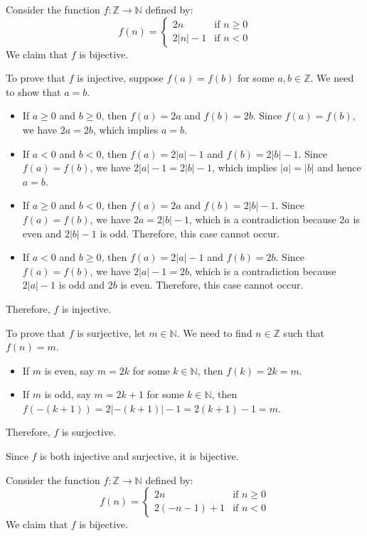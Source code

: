 \documentclass[11pt]{article}
\begin{document}
\begin{example}
    Consider the function $f: \mathbb{Z} \to \mathbb{N}$ defined by:
    \[
        f(n) = 
        \begin{cases} 
            2n & \text{if } n \geq 0 \\
            2|n| - 1 & \text{if } n < 0 
        \end{cases}
    \]
    We claim that $f$ is bijective.

    To prove that $f$ is injective, suppose $f(a) = f(b)$ for some $a, b \in \mathbb{Z}$. We need to show that $a = b$.
    \begin{itemize}
        \item If $a \geq 0$ and $b \geq 0$, then $f(a) = 2a$ and $f(b) = 2b$. Since $f(a) = f(b)$, we have $2a = 2b$, which implies $a = b$.
        \item If $a < 0$ and $b < 0$, then $f(a) = 2 |a| - 1$ and $f(b) = 2 |b| - 1$. Since $f(a) = f(b)$, we have $2 |a| - 1 = 2 |b| - 1$, which implies $ |a| =  |b|$ and hence $a = b$.
        \item If $a \geq 0$ and $b < 0$, then $f(a) = 2a$ and $f(b) = 2 |b| - 1$. Since $f(a) = f(b)$, we have $2a = 2  |b| - 1$, which is a contradiction because $2a$ is even and $2 |b| - 1$ is odd. Therefore, this case cannot occur.
        \item If $a < 0$ and $b \geq 0$, then $f(a) = 2 |a| - 1$ and $f(b) = 2b$. Since $f(a) = f(b)$, we have $2 |a| - 1 = 2b$, which is a contradiction because $2 |a| - 1$ is odd and $2b$ is even. Therefore, this case cannot occur.
    \end{itemize}
    Therefore, $f$ is injective.

    To prove that $f$ is surjective, let $m \in \mathbb{N}$. We need to find $n \in \mathbb{Z}$ such that $f(n) = m$.
    \begin{itemize}
        \item If $m$ is even, say $m = 2k$ for some $k \in \mathbb{N}$, then $f(k) = 2k = m$.
        \item If $m$ is odd, say $m = 2k + 1$ for some $k \in \mathbb{N}$, then $f(-(k+1)) = 2|-(k+1)| - 1 = 2(k+1) - 1 = m$.
    \end{itemize}
    Therefore, $f$ is surjective.

    Since $f$ is both injective and surjective, it is bijective.
\end{example}


\begin{example}
    Consider the function $f: \mathbb{Z} \to \mathbb{N}$ defined by:
    \[
        f(n) = 
        \begin{cases} 
            2n & \text{if } n \geq 0 \\
            2(-n - 1) + 1 & \text{if } n < 0 
        \end{cases}
    \]
    We claim that $f$ is bijective.
\end{example}
\end{document}
